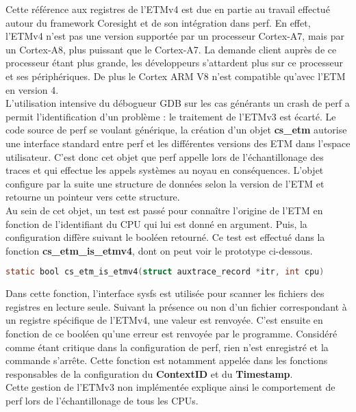 Cette référence aux registres de l'ETMv4 est due en partie au travail effectué
autour du framework Coresight et de son intégration dans perf. En effet,
l'ETMv4 n'est pas une version supportée par un processeur Cortex-A7, mais par
un Cortex-A8, plus puissant que le Cortex-A7. La demande client auprès de ce
processeur étant plus grande, les développeurs s'attardent plus sur ce
processeur et ses périphériques. De plus le Cortex ARM V8 n'est compatible
qu'avec l'ETM en version 4. \\

L'utilisation intensive du débogueur GDB sur les cas générants un crash de
perf a permit l'identification d'un problème : le traitement de l'ETMv3 est
écarté. Le code source de perf se voulant générique, la création d'un objet
\textbf{cs\_etm} autorise une interface standard entre perf et les différentes
versions des ETM dans l'espace utilisateur. C'est donc cet objet que perf
appelle lors de l'échantillonage des traces et qui effectue les appels
systèmes au noyau en conséquences. L'objet configure par la suite une
structure de données selon la version de l'ETM et retourne un pointeur vers
cette structure. \\

Au sein de cet objet, un test est passé pour connaître l'origine de l'ETM en
fonction de l'identifiant du CPU qui lui est donné en argument. Puis, la
configuration diffère suivant le booléen retourné. Ce test est effectué dans
la fonction \textbf{cs\_etm\_is\_etmv4}, dont on peut voir le prototype
ci-dessous.

\begin{lstlisting}[language=C]
static bool cs_etm_is_etmv4(struct auxtrace_record *itr, int cpu)
\end{lstlisting}

Dans cette fonction, l'interface sysfs est utilisée pour scanner les fichiers
des registres en lecture seule. Suivant la présence ou non d'un fichier
correspondant à un registre spécifique de l'ETMv4, une valeur est renvoyée.
C'est ensuite en fonction de ce booléen qu'une erreur est renvoyée par le
programme. Considéré comme étant critique dans la configuration de perf, rien
n'est enregistré et la commande s'arrête. Cette fonction est notamment appelée
dans les fonctions responsables de la configuration du \textbf{ContextID} et
du \textbf{Timestamp}. \\

Cette gestion de l'ETMv3 non implémentée explique ainsi le comportement de
perf lors de l'échantillonage de tous les CPUs. 

